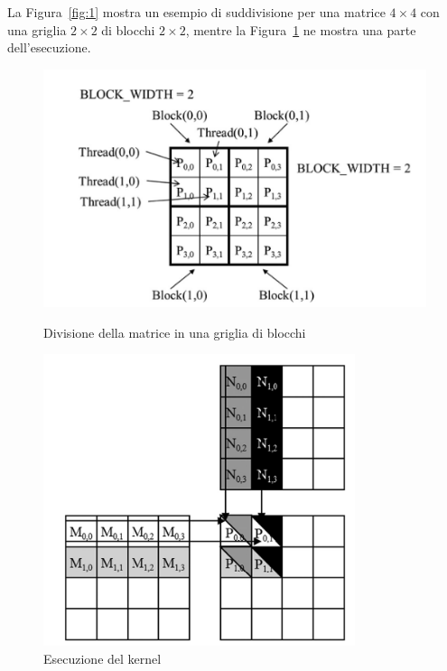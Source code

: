\documentclass[a4paper]{article}
\begin{document}
\newpage

La Figura~\ref{fig:1} mostra un esempio di suddivisione per una matrice ${4\times{4}}$ con una griglia $2\times{2}$ di blocchi $2\times{2}$, mentre la Figura~\ref{fig:2} ne mostra una parte dell'esecuzione.

\begin{figure}[H]
    \centering
    \begin{minipage}[b]{0.45\textwidth}
        \centering
        \includegraphics[width=\textwidth]{imgs/matrix_division.png}
        \caption{Divisione della matrice in una griglia di blocchi}
        \label{fig:1}
    \end{minipage}
    \hspace{0.05\textwidth}
    \begin{minipage}[b]{0.45\textwidth}
        \centering
        \includegraphics[width=\textwidth]{imgs/execution1.png}
        \caption{Esecuzione del kernel}
        \label{fig:2}
    \end{minipage}
\end{figure}
\end{document}

